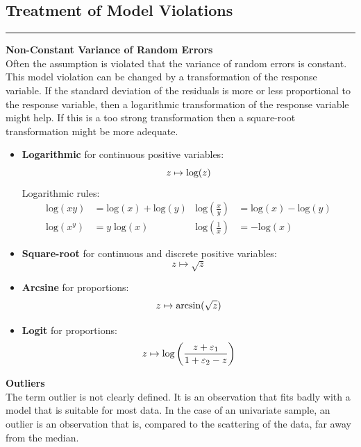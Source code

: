 \subsection{Treatment of Model Violations}
\noindent\rule[\linienAbstand]{\linewidth}{\linienDicke}

\textbf{Non-Constant Variance of Random Errors}\\
Often the assumption is violated that the variance of random errors is constant.\\
This model violation can be changed by a transformation of the response variable. If the standard deviation of the residuals is more or less proportional to the response variable, then a logarithmic transformation of the response variable might help. If this is a too strong transformation then a square-root transformation might be more adequate.
\begin{itemize}
  \item \textbf{Logarithmic} for continuous positive variables:
  \begin{equation}
    z \mapsto \textup{log}(z)
  \end{equation}
  Logarithmic rules:
  \begin{align*}
    \text{log}(xy) &= \text{log}(x) + \text{log}(y) &
    \text{log}\left(\frac{x}{y}\right) &= \text{log}(x) - \text{log}(y) \\
    \text{log}\left(x^y\right) &= y\;\text{log}(x) &
    \text{log}\left(\frac{1}{x}\right) &= - \text{log}(x)
  \end{align*}

  \item \textbf{Square-root} for continuous and discrete positive variables:
  \begin{equation}
    z \mapsto \sqrt{z}
  \end{equation}
  \item \textbf{Arcsine} for proportions:
  \begin{equation}
    z \mapsto \textup{arcsin}(\sqrt{z})
  \end{equation}
  \item \textbf{Logit} for proportions:
  \begin{equation}
    z \mapsto \textup{log}\left(\frac{z + \varepsilon_1}{1 + \varepsilon_2 - z} \right)
  \end{equation}
\end{itemize}

\textbf{Outliers}\\
The term outlier is not clearly defined. It is an observation that fits badly with a model that is suitable for most data. In the case of an univariate sample, an outlier is an observation that is, compared to the scattering of the data, far away from the median.\\

